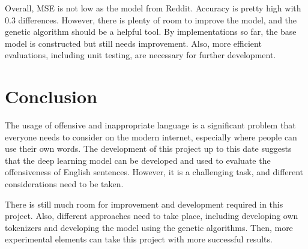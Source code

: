 \documentclass[11pt, natbib=false]{article}
\begin{document}
\begin{multicols}{2}
Overall, MSE is not low as the model from Reddit.
Accuracy is pretty high with 0.3 differences.
However, there is plenty of room to improve the model, and the genetic algorithm should be a helpful tool. By implementations so far, the base model is constructed but still needs improvement.
Also, more efficient evaluations, including unit testing, are necessary for further development.


\section{Conclusion}
The usage of offensive and inappropriate language is a significant problem that everyone needs to consider on the modern internet, especially where people can use their own words.
The development of this project up to this date suggests that the deep learning model can be developed and used to evaluate the offensiveness of English sentences.
However, it is a challenging task, and different considerations need to be taken.

There is still much room for improvement and development required in this project.
Also, different approaches need to take place, including developing own tokenizers and developing the model using the genetic algorithms.
Then, more experimental elements can take this project with more successful results.

\newpage
\printbibliography
\end{multicols}
\newpage
\end{document}
